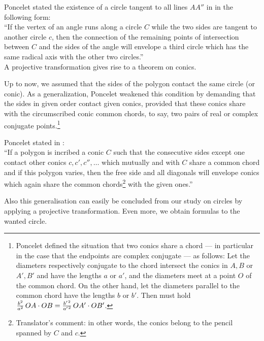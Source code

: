 Poncelet stated the existence of a circle tangent to all lines $AA''$ in \cite[p.~326 and Pl.~XI, Fig.~93]{poncelet1822} in the following form:\\[0.5mm]
``If the vertex of an angle runs along a circle $C$ while the two sides are tangent to another circle $c$, then the connection of the remaining points of intersection between $C$ and the sides of the angle will envelope a third circle which has the same radical axis with the other two circles.''
\\
A projective transformation gives rise to a theorem on conics.
\goodbreak
\bigskip{}

\medskip\noindent
Up to now, we assumed that the sides of the polygon contact the same circle (or conic).
As a generalization, Poncelet weakened this condition by demanding that the sides in given order contact given conics, provided that these conics share with the circumscribed conic common chords, to say, two pairs of real or complex conjugate points.\footnote{
Poncelet defined the situation that two conics share a chord --- in particular in the case that the endpoints are complex conjugate --- as follows:  
Let the diameters respectively conjugate to the chord intersect the conics in $A,B$ or $A',B'$ and have the lengths $a$ or $a'$, and the diameters meet at a point $O$ of the common chord. 
On the other hand, let the diameters parallel to the common chord have the lengths $b$ or $b'$.
Then must hold $\frac{b^2}{a^2}\,OA\cdot OB = \frac{b^{\prime\mskip 2mu 2}}{a^{\prime\mskip 2mu 2}}\,OA'\cdot OB'$.}

Poncelet stated in \cite[p.~327]{poncelet1822}:
\\[0.5mm]
``If a polygon is incribed a conic $C$ such that the consecutive sides except one contact other conics $c, c', c'',\dots$ which mutually and with $C$ share a common chord and if this polygon varies, then the free side and all diagonals will envelope conics which again share the common chords\footnote{
Translator's comment: in other words, the conics belong to the pencil spanned by $C$ and $c$.} 
 with the given ones.''

Also this generalisation can easily be concluded from our study on circles by applying a projective transformation.
Even more, we obtain formulas to the wanted circle.

